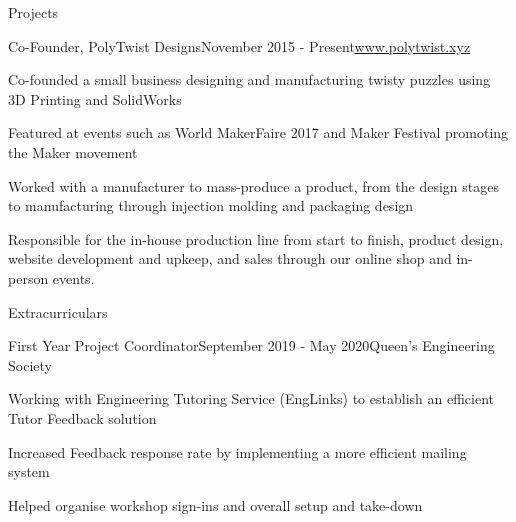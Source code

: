 \documentclass{resume} %
\begin{document}
\begin{rSection}{Projects}

\begin{rSubsection}{Co-Founder, PolyTwist Designs}{November 2015 - Present}{\url{www.polytwist.xyz}}{}
\item Co-founded a small business designing and manufacturing twisty puzzles using 3D Printing and SolidWorks
\item Featured at events such as World MakerFaire 2017 and Maker Festival promoting the Maker movement
\item Worked with a manufacturer to mass-produce a product, from the design stages to manufacturing through injection molding and packaging design
\item Responsible for the in-house production line from start to finish, product design, website development and upkeep, and sales through our online shop and in-person events.
\end{rSubsection}
\iffalse
\begin{rSubsection}{Hyperloop Model Design}{September 2019 - December 2019}{}{}
\item Designed, built, wired and programmed a 1:36 scale prototype of a hyperloop vehicle powered by an Arduino and DC Motor
\item Created multiple mathematical models to describe the vehicle's behaviour, including chassis stress, energy loss, and total power consumption
\item Optimized energy consumption by minimizing drag and bearing friction, resulting in an 89\% energy efficiency
\item Wrote a detailed feasibility analysis of a Hyperloop route between Windsor and Quebec City, taking into account social, economic, environmental and legal implications of Hyperloop transportation
\end{rSubsection}
\fi

\end{rSection}



\begin{rSection}{Extracurriculars}
\begin{rSubsection}{First Year Project Coordinator}{September 2019 - May 2020}{Queen's Engineering Society}{}
\item Working with Engineering Tutoring Service (EngLinks) to establish an efficient Tutor Feedback solution
\item Increased Feedback response rate by implementing a more efficient mailing system
\item Helped organise workshop sign-ins and overall setup and take-down

\end{rSubsection}

\end{rSection}
\end{document}
